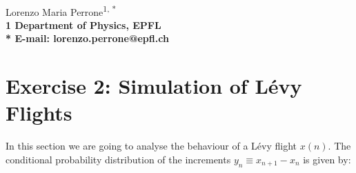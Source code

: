\documentclass[11pt,letterpaper]{article}
\begin{document}
\vspace*{0.30in}

\begin{flushleft}
{\Large
\textbf{}
}
\newline
\\
Lorenzo Maria Perrone\textsuperscript{1, *}
\\
\bf{1} Department of Physics, EPFL
\\

% 
%





* E-mail: lorenzo.perrone@epfl.ch
\end{flushleft}

\section{Exercise 2: Simulation of Lévy Flights}
In this section we are going to analyse the behaviour of a Lévy flight $x(n)$. The conditional probability distribution of the increments $y_n \equiv x_{n+1} - x_n $ is given by:
\end{document}
